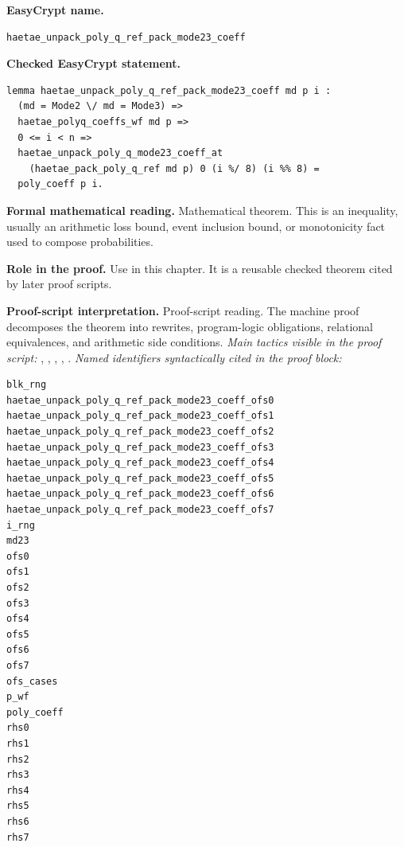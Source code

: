 \begin{formaltheorem}
\noindent\textbf{EasyCrypt name.}
\begin{lstlisting}[language=EasyCrypt,basicstyle=\ttfamily\scriptsize]
haetae_unpack_poly_q_ref_pack_mode23_coeff
\end{lstlisting}
\noindent\textbf{Checked EasyCrypt statement.}
\begin{lstlisting}[language=EasyCrypt,basicstyle=\ttfamily\scriptsize]
lemma haetae_unpack_poly_q_ref_pack_mode23_coeff md p i :
  (md = Mode2 \/ md = Mode3) =>
  haetae_polyq_coeffs_wf md p =>
  0 <= i < n =>
  haetae_unpack_poly_q_mode23_coeff_at
    (haetae_pack_poly_q_ref md p) 0 (i %/ 8) (i %% 8) =
  poly_coeff p i.
\end{lstlisting}
\noindent\textbf{Formal mathematical reading.}
Mathematical theorem. This is an inequality, usually an arithmetic loss bound, event inclusion bound, or monotonicity fact used to compose probabilities.

\noindent\textbf{Role in the proof.}
Use in this chapter. It is a reusable checked theorem cited by later proof scripts.

\noindent\textbf{Proof-script interpretation.}
Proof-script reading. The machine proof decomposes the theorem into rewrites, program-logic obligations, relational equivalences, and arithmetic side conditions.
\emph{Main tactics visible in the proof script:} , , , , .
\emph{Named identifiers syntactically cited in the proof block:}
\begin{lstlisting}[language=EasyCrypt,basicstyle=\ttfamily\scriptsize]
blk_rng
haetae_unpack_poly_q_ref_pack_mode23_coeff_ofs0
haetae_unpack_poly_q_ref_pack_mode23_coeff_ofs1
haetae_unpack_poly_q_ref_pack_mode23_coeff_ofs2
haetae_unpack_poly_q_ref_pack_mode23_coeff_ofs3
haetae_unpack_poly_q_ref_pack_mode23_coeff_ofs4
haetae_unpack_poly_q_ref_pack_mode23_coeff_ofs5
haetae_unpack_poly_q_ref_pack_mode23_coeff_ofs6
haetae_unpack_poly_q_ref_pack_mode23_coeff_ofs7
i_rng
md23
ofs0
ofs1
ofs2
ofs3
ofs4
ofs5
ofs6
ofs7
ofs_cases
p_wf
poly_coeff
rhs0
rhs1
rhs2
rhs3
rhs4
rhs5
rhs6
rhs7
\end{lstlisting}

\end{formaltheorem}

